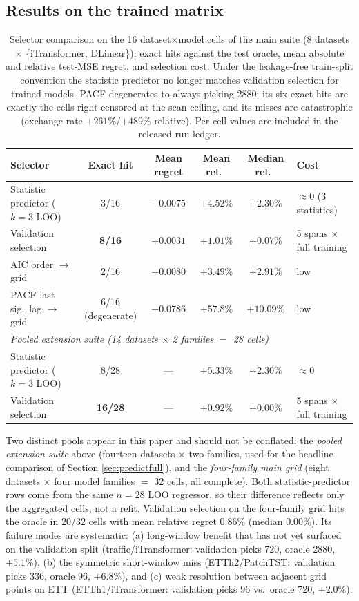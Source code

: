 \subsection{Results on the trained matrix}

\begin{table}[t]
\caption{Selector comparison on the 16 dataset$\times$model cells of the main suite (8 datasets $\times$ \{iTransformer, DLinear\}): exact hits against the test oracle, mean absolute and relative test-MSE regret, and selection cost. Under the leakage-free train-split convention the statistic predictor no longer matches validation selection for trained models. PACF degenerates to always picking 2880; its six exact hits are exactly the cells right-censored at the scan ceiling, and its misses are catastrophic (exchange rate $+261\%$/$+489\%$ relative). Per-cell values are included in the released run ledger.}
\label{tab:selectors}
\centering\footnotesize
\begin{tabular}{lcccc l}
\toprule
Selector & Exact hit & Mean regret & Mean rel.\ & Median rel.\ & Cost \\
\midrule
Statistic predictor ($k{=}3$ LOO) & 3/16 & $+0.0075$ & $+4.52\%$ & $+2.30\%$ & $\approx 0$ (3 statistics) \\
Validation selection & \textbf{8/16} & \textbf{$+0.0031$} & \textbf{$+1.01\%$} & \textbf{$+0.07\%$} & 5 spans $\times$ full training \\
AIC order $\to$ grid & 2/16 & $+0.0080$ & $+3.49\%$ & $+2.91\%$ & low \\
PACF last sig.\ lag $\to$ grid & 6/16 (degenerate) & $+0.0786$ & $+57.8\%$ & $+10.09\%$ & low \\
\midrule
\multicolumn{6}{l}{\emph{Pooled extension suite (14 datasets $\times$ 2 families $=$ 28 cells)}} \\
Statistic predictor ($k{=}3$ LOO) & 8/28 & --- & $+5.33\%$ & $+2.30\%$ & $\approx 0$ \\
Validation selection & \textbf{16/28} & --- & \textbf{$+0.92\%$} & \textbf{$+0.00\%$} & 5 spans $\times$ full training \\
\bottomrule
\end{tabular}
\end{table}

Two distinct pools appear in this paper and should not be conflated: the \emph{pooled extension suite} above (fourteen datasets $\times$ two families, used for the headline comparison of Section \ref{sec:predictfull}), and the \emph{four-family main grid} (eight datasets $\times$ four model families $=$ 32 cells, all complete). Both statistic-predictor rows come from the same $n{=}28$ LOO regressor, so their difference reflects only the aggregated cells, not a refit. Validation selection on the four-family grid hits the oracle in 20/32 cells with mean relative regret $0.86\%$ (median $0.00\%$). Its failure modes are systematic: (a) long-window benefit that has not yet surfaced on the validation split (traffic/iTransformer: validation picks 720, oracle 2880, $+5.1\%$), (b) the symmetric short-window miss (ETTh2/PatchTST: validation picks 336, oracle 96, $+6.8\%$), and (c) weak resolution between adjacent grid points on ETT (ETTh1/iTransformer: validation picks 96 vs.\ oracle 720, $+2.0\%$).

